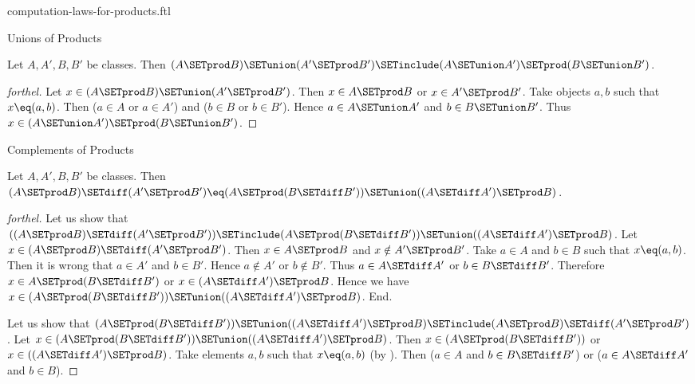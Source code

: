 \documentclass{naproche-library}
\begin{document}
\begin{smodule}[title=Computation Laws for Cartesian Products]{computation-laws-for-products.ftl}
\begin{sfragment}{Unions of Products}
  \begin{proposition}[forthel,id=FOUNDATIONS_05_7090174334861312]
    Let $A, A', B, B'$ be classes.
    Then $(A \SETprod B) \SETunion (A' \SETprod B') \SETinclude (A \SETunion A') \SETprod (B \SETunion B')$.
  \end{proposition}
  \begin{proof}[forthel]
    Let $x \in (A \SETprod B) \SETunion (A' \SETprod B')$.
    Then $x \in A \SETprod B$ or $x \in A' \SETprod B'$.
    Take objects $a, b$ such that $x \eq (a, b)$.
    Then ($a \in A$ or $a \in A'$) and ($b \in B$ or $b \in B'$).
    Hence $a \in A \SETunion A'$ and $b \in B \SETunion B'$.
    Thus $x \in (A \SETunion A') \SETprod (B \SETunion B')$.
  \end{proof}
\end{sfragment}

\begin{sfragment}{Complements of Products}
  \begin{proposition}[forthel,id=FOUNDATIONS_05_5552125989879808]
    Let $A, A', B, B'$ be classes.
    Then $(A \SETprod B) \SETdiff (A' \SETprod B') \eq (A \SETprod (B \SETdiff B')) \SETunion ((A \SETdiff A') \SETprod B)$.
  \end{proposition}
  \begin{proof}[forthel]
    Let us show that $((A \SETprod B) \SETdiff (A' \SETprod B')) \SETinclude (A \SETprod (B \SETdiff B')) \SETunion ((A \SETdiff A') \SETprod B)$.
      Let $x \in (A \SETprod B) \SETdiff (A' \SETprod B')$.
      Then $x \in A \SETprod B$ and $x \notin A' \SETprod B'$.
      Take $a \in A$ and $b \in B$ such that $x \eq (a, b)$.
      Then it is wrong that $a \in A'$ and $b \in B'$.
      Hence $a \notin A'$ or $b \notin B'$.
      Thus $a \in A \SETdiff A'$ or $b \in B \SETdiff B'$.
      Therefore $x \in A \SETprod (B \SETdiff B')$ or $x \in (A \SETdiff A') \SETprod B$.
      Hence we have $x \in (A \SETprod (B \SETdiff B')) \SETunion ((A \SETdiff A') \SETprod B)$.
    End.

    Let us show that $(A \SETprod (B \SETdiff B')) \SETunion ((A \SETdiff A') \SETprod B) \SETinclude (A \SETprod B) \SETdiff (A' \SETprod B')$.
      Let $x \in (A \SETprod (B \SETdiff B')) \SETunion ((A \SETdiff A') \SETprod B)$.
      Then $x \in (A \SETprod (B \SETdiff B'))$ or $x \in ((A \SETdiff A') \SETprod B)$.
      Take elements $a,b$ such that $x \eq (a, b)$ (by ).
      Then ($a \in A$ and $b \in B \SETdiff B'$) or ($a \in A \SETdiff A'$ and $b \in B$).


\end{proof}
\end{sfragment}
\end{smodule}
\end{document}
